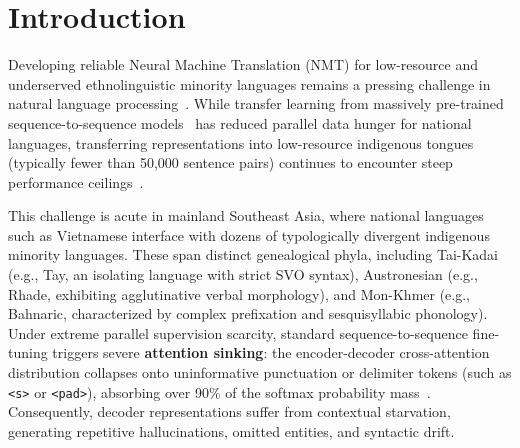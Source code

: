 \documentclass[11pt]{article}
\begin{document}
\section{Introduction}
\label{sec:intro}

Developing reliable Neural Machine Translation (NMT) for low-resource and underserved ethnolinguistic minority languages remains a pressing challenge in natural language processing~\cite{10.1145/3567592,her-kruschwitz-2024-investigating,raja-vats-2025-parallel}. While transfer learning from massively pre-trained sequence-to-sequence models~\cite{tran2021bartpho,liu-etal-2020-multilingual-denoising,phan2022vit5} has reduced parallel data hunger for national languages, transferring representations into low-resource indigenous tongues (typically fewer than 50,000 sentence pairs) continues to encounter steep performance ceilings~\cite{nguyen-etal-2025-serving}.

This challenge is acute in mainland Southeast Asia, where national languages such as Vietnamese interface with dozens of typologically divergent indigenous minority languages. These span distinct genealogical phyla, including Tai-Kadai (e.g., Tay, an isolating language with strict SVO syntax), Austronesian (e.g., Rhade, exhibiting agglutinative verbal morphology), and Mon-Khmer (e.g., Bahnaric, characterized by complex prefixation and sesquisyllabic phonology). Under extreme parallel supervision scarcity, standard sequence-to-sequence fine-tuning triggers severe \textbf{attention sinking}: the encoder-decoder cross-attention distribution collapses onto uninformative punctuation or delimiter tokens (such as \texttt{<s>} or \texttt{<pad>}), absorbing over 90\% of the softmax probability mass~\cite{vaswani2017attention}. Consequently, decoder representations suffer from contextual starvation, generating repetitive hallucinations, omitted entities, and syntactic drift.
\end{document}
